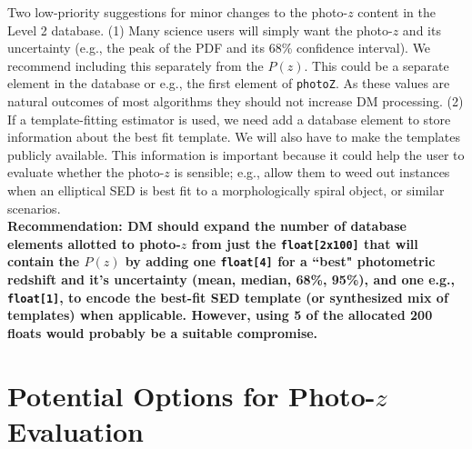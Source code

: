 \documentclass[DM,lsstdraft,toc]{lsstdoc}
\begin{document}
Two low-priority suggestions for minor changes to the photo-$z$ content in the Level 2 database. (1) Many science users will simply want the photo-$z$ and its uncertainty (e.g., the peak of the PDF and its 68\% confidence interval). We recommend including this separately from the $P(z)$. This could be a separate element in the database or e.g., the first element of \texttt{photoZ}. As these values are natural outcomes of most algorithms they should not increase DM processing. (2) If a template-fitting estimator is used, we need add a database element to store information about the best fit template. We will also have to make the templates publicly available. This information is important because it could help the user to evaluate whether the photo-$z$ is sensible; e.g., allow them to weed out instances when an elliptical SED is best fit to a morphologically spiral object, or similar scenarios. \\
\textbf{Recommendation: DM should expand the number of database elements allotted to photo-$z$ from just the \texttt{float[2x100]} that will contain the $P(z)$ by adding one \texttt{float[4]} for a ``best" photometric redshift and it's uncertainty (mean, median, 68\%, 95\%), and one e.g., \texttt{float[1]}, to encode the best-fit SED template (or synthesized mix of templates) when applicable. However, using 5 of the allocated 200 floats would probably be a suitable compromise.}



\section{Potential Options for Photo-$z$ Evaluation}\label{sec:options}
\end{document}
